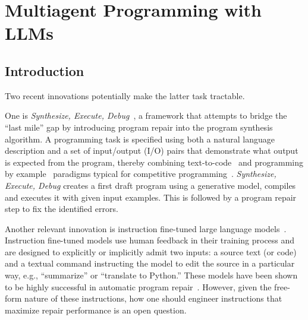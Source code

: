 \chapter{Multiagent Programming with LLMs}
\label{ch:seidr}


\section{Introduction}
\label{sec:seidr-intro}

Two recent innovations potentially make the latter task tractable.

One is \emph{Synthesize, Execute, Debug}~\cite{guptaSynthesizeExecuteDebug2020}, a framework that attempts to bridge the ``last mile'' gap by introducing program repair into the program synthesis algorithm. 
A programming task is specified using both a natural language description and a set of input/output (I/O) pairs that demonstrate what output is expected from the program, thereby combining text-to-code~\cite{iyer2018:mapping} and programming by example~\cite{halbertProgrammingExample1984,gulwani2016:programming} paradigms typical for competitive programming~\cite{zavershynskyi2018:naps}.
\emph{Synthesize, Execute, Debug} creates a first draft program using a generative model, compiles and executes it with given input examples.
This is followed by a program repair step to fix the identified errors.

Another relevant innovation is instruction fine-tuned large language models~\cite{zhang2024:instruction}. 
Instruction fine-tuned models use human feedback \cite{chaudhariRLHFDecipheredCritical2024, kaufmannSurveyReinforcementLearning2024} in their training process and are designed to explicitly or implicitly admit two inputs: a source text (or code) and a textual command instructing the model to edit the source in a particular way, e.g., ``summarize'' or ``translate to Python.''
These models have been shown to be highly successful in automatic program repair~\cite{fanAutomatedRepairPrograms2023}. 
However, given the free-form nature of these instructions, how one should engineer instructions that maximize repair performance is an open question. 

